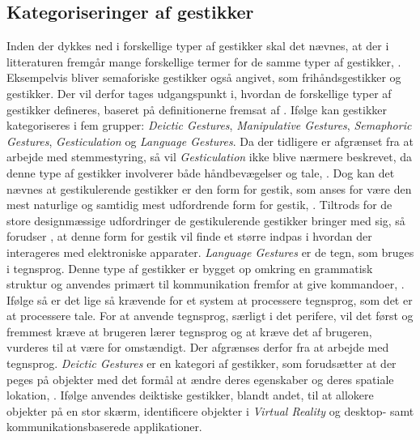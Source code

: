 \subsection{Kategoriseringer af gestikker}
\label{KategoriseringerAfGestikker}
%
Inden der dykkes ned i forskellige typer af gestikker skal det nævnes, at der i litteraturen fremgår mange forskellige termer for de samme typer af gestikker, \parencite[s. 3]{PDF:ATaxonomyOfGestures}. Eksempelvis bliver semaforiske gestikker også angivet, som frihåndsgestikker og gestikker. Der vil derfor tages udgangspunkt i, hvordan de forskellige typer af gestikker defineres, baseret på definitionerne fremsat af \textcite[ss. 4-9]{PDF:ATaxonomyOfGestures}. Ifølge \textcite[s. 4]{PDF:ATaxonomyOfGestures} kan gestikker kategoriseres i fem grupper: \textit{Deictic Gestures}, \textit{Manipulative Gestures}, \textit{Semaphoric Gestures}, \textit{Gesticulation} og \textit{Language Gestures}. \blankline
%
Da der tidligere er afgrænset fra at arbejde med stemmestyring, så vil \textit{Gesticulation} ikke blive nærmere beskrevet, da denne type af gestikker involverer både håndbevægelser og tale, \parencite[s. 7]{PDF:ATaxonomyOfGestures}. Dog kan det nævnes at gestikulerende gestikker er den form for gestik, som anses for være den mest naturlige og samtidig mest udfordrende form for gestik, \parencite[s. 7]{PDF:ATaxonomyOfGestures}. Tiltrods for de store designmæssige udfordringer de gestikulerende gestikker bringer med sig, så forudser \textcite[s. 28]{PDF:ATaxonomyOfGestures}, at denne form for gestik vil finde et større indpas i hvordan der interageres med elektroniske apparater. \blankline
%
\textit{Language Gestures} er de tegn, som bruges i tegnsprog. Denne type af gestikker er bygget op omkring en grammatisk struktur og anvendes primært til kommunikation fremfor at give kommandoer, \parencite[s. 8]{PDF:ATaxonomyOfGestures}. Ifølge \textcite[s. 8]{PDF:ATaxonomyOfGestures} så er det lige så krævende for et system at processere tegnsprog, som det er at processere tale. For at anvende tegnsprog, særligt i det perifere, vil det først og fremmest kræve at brugeren lærer tegnsprog og at kræve det af brugeren, vurderes til at være for omstændigt. Der afgrænses derfor fra at arbejde med tegnsprog. \blankline
%  
\textit{Deictic Gestures} er en kategori af gestikker, som forudsætter at der peges på objekter med det formål at ændre deres egenskaber og deres spatiale lokation, \parencite[s. 4]{PDF:ATaxonomyOfGestures}. Ifølge \textcite[ss. 4-5]{PDF:ATaxonomyOfGestures} anvendes deiktiske gestikker, blandt andet, til at allokere objekter på en stor skærm, identificere objekter i \textit{Virtual Reality} og desktop- samt kommunikationsbaserede applikationer. \blankline
